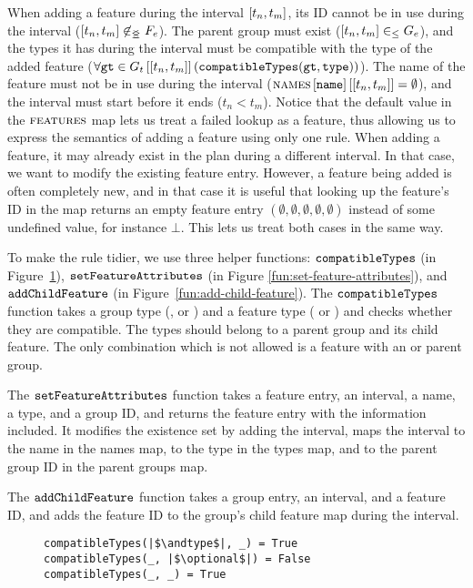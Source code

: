 When adding a feature during the interval $\interval{t_n}{t_m}$, its ID cannot be in use during the interval ($\interval{t_n}{t_m} \not \innr F_e$). The parent group must exist ($\interval{t_n}{t_m} \inn G_e$), and the types it has during the interval must be compatible with the type of the 
added feature ($\forall \var{gt} \in \lookup{G_t}{\interval{t_n}{t_m}} (\var{compatibleTypes}(\var{gt}, \var{type}))$). The name of the feature must not be in use during the interval ($\lookup{\lookup{\names{}}{\var{name}}}{\interval{t_n}{t_m}} = \emptyset$), and the interval must start before it ends ($t_n < t_m$). Notice that the default value in the $\textsc{features}{}$ map lets us treat a failed lookup as a feature, thus allowing us to express the semantics of adding a feature using only one rule. When adding a feature, it may already exist in the plan during a different interval. In that case, we want to modify the existing feature entry. However, a feature being added is often completely new, and in that case it is useful that looking up the feature's ID in the \features{} map returns an empty feature entry $(\emptyset, \emptyset, \emptyset, \emptyset, \emptyset)$ instead of some undefined value, for instance $\bot$. This lets us treat both cases in the same way.

To make the rule tidier, we use three helper functions: $\texttt{compatibleTypes}$ (in Figure~\ref{fun:compatible-types}), $\texttt{setFeatureAttributes}$ (in Figure \ref{fun:set-feature-attributes}), and $\texttt{addChildFeature}$ (in Figure~\ref{fun:add-child-feature}). The $\texttt{compatibleTypes}$ function takes a group type (\andtype{}, \ortype{} or \xortype{}) and a feature type (\mandatory{} or \optional{}) and checks whether they are compatible. The types should belong to a parent group and its child feature. The only combination which is not allowed is a \mandatory{} feature with an \xortype{} or \ortype{} parent group.

The $\texttt{setFeatureAttributes}$ function takes a feature entry, an interval, a name, a type, and a group ID, and returns the feature entry with the information included. It modifies the existence set by adding the interval, maps the interval to the name in the names map, to the type in the types map, and to the parent group ID in the parent groups map.

The $\texttt{addChildFeature}$ function takes a group entry, an interval, and a feature ID, and adds the feature ID to the group's child feature map during the interval.

\begin{figure}[h]
  \begin{verbatim}
compatibleTypes(|$\andtype$|, _) = True
compatibleTypes(_, |$\optional$|) = False
compatibleTypes(_, _) = True
  \end{verbatim}
  \caption{}
  \label{fun:compatible-types}
\end{figure}

